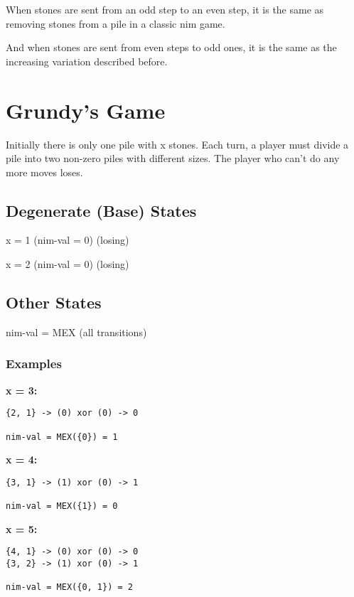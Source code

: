 When stones are sent from an odd step to an even step, it is the same as removing stones from a pile in a classic nim game.

And when stones are sent from even steps to odd ones, it is the same as the increasing variation described before.

\section{Grundy's Game}

Initially there is only one pile with x stones.
Each turn, a player must divide a pile into two non-zero piles with different sizes.
The player who can't do any more moves loses.

\vspace{5pts}

\subsection{Degenerate (Base) States}

x = 1 (nim-val = 0) (losing)

x = 2 (nim-val = 0) (losing)

\subsection{Other States}

nim-val = MEX (all transitions)

\subsubsection{Examples}

\textbf{x = 3:}
\begin{lstlisting}
{2, 1} -> (0) xor (0) -> 0

nim-val = MEX({0}) = 1
\end{lstlisting}

\textbf{x = 4:}
\begin{lstlisting}
{3, 1} -> (1) xor (0) -> 1

nim-val = MEX({1}) = 0
\end{lstlisting}

\textbf{x = 5:}
\begin{lstlisting}
{4, 1} -> (0) xor (0) -> 0
{3, 2} -> (1) xor (0) -> 1

nim-val = MEX({0, 1}) = 2
\end{lstlisting}

